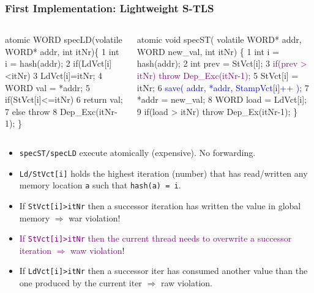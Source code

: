 \documentclass{beamer}
\newcommand{\blue}[1]{\textcolor{Blue}{{#1}}}
\newcommand{\purple}[1]{\textcolor{Purple}{{#1}}}
\newcommand{\emp}[1]{\textcolor{DikuRed}{ #1}}
\newcommand{\emphh}[1]{\textcolor{CosGreen}{ #1}}
\begin{document}
\begin{frame}[fragile,t]
  \frametitle{First Implementation: Lightweight S-TLS}

\begin{columns}
\begin{colorcode}
\emp{atomic} WORD \emphh{specLD}(volatile
      WORD* addr, int itNr)\{
1   int i = hash(addr);
2   \emphh{if(LdVct[i]<itNr)}
3      \emphh{LdVct[i]=itNr;}
4   WORD val = *addr;
5   if(StVct[i]<=itNr)
6      return val;
7   \emp{else throw}
8     \emp{Dep_Exc(itNr-1);}    \}
\end{colorcode}
\begin{colorcode}
\emp{atomic} void \emphh{specST}( volatile WORD* addr,
                    WORD new_val, int itNr) \{
1   int i    = hash(addr);
2   int prev = StVct[i];
3   \purple{if(prev > itNr) throw Dep_Exc(itNr-1);}
5   \emphh{StVct[i] = itNr;}
6   \blue{save( addr, *addr, StampVct[i]++ );}
7   *addr     = new_val;
8   WORD load = LdVct[i];
9   \alert{if(load > itNr) throw Dep_Ex(itNr-1);}  \}
\end{colorcode}
\end{columns}
\medskip\pause

\begin{itemize}
    \item {\tt specST/specLD} execute atomically (expensive). No forwarding.
    \item \emphh{{\tt Ld/StVct[i]} holds the highest iteration (number) that
            has read/written any memory location {\tt a} such that {\tt hash(a) = i}.}
    \item \emp{If {\tt StVct[i]>itNr} then a successor iteration has written the
                value in global memory $\Rightarrow$ {\sc war} violation}!
    \item \purple{If {\tt StVct[i]>itNr} then the current thread needs to overwrite
                a successor iteration $\Rightarrow$ {\sc waw} violation}!
    \item \alert{If {\tt LdVct[i]>itNr} then a successor iter has consumed
                another value than the one produced by the current iter $\Rightarrow$ {\sc raw} violation.}
\end{itemize}

\end{frame}
\end{document}
